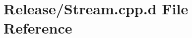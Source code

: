 \hypertarget{_release_2_stream_8cpp_8d}{\section{\-Release/\-Stream.cpp.\-d \-File \-Reference}
\label{_release_2_stream_8cpp_8d}
}
